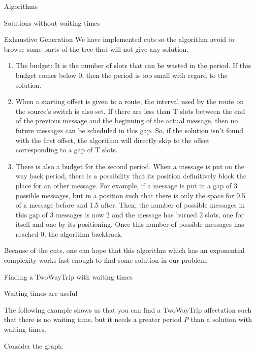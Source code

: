 \documentclass[a4paper,10pt]{report}
\begin{document}
\begin{chapter}{Algorithms}
\begin{section}{Solutions without waiting times}
\begin{subsection}{Exhaustive Generation}
We have implemented cuts so the algorithm avoid to browse some parts of the tree that will not give any solution.
\begin{enumerate}
 \item The budget: It is the number of slots that can be wasted in the period. If this budget comes below 0, then the period is too small with regard to
 the solution.
 \item When a starting offset is given to a route, the interval used by the route on the source's switch is also set. If there are less than T slots
 between the end of the previous message and the beginning of the actual message, then no future messages can be scheduled in this gap.
 So, if the solution isn't found with the first offset, the algorithm will directly skip to the offset corresponding to a gap of T slots.
 \item There is also a budget for the second period. When a message is put on the way back period, there is a possibility that its position definitively block the place for an other message. For example, if a message is put in a gap of 3 possible messages, but in a position such that there is only the space for 0.5 of a message before and 1.5 after. Then, the number of possible messages in this gap of 3 messages is now 2 and the message has burned 2 slots, one for itself and one by its positioning.
 Once this number of possible messages has reached 0, the algorithm backtrack.
\end{enumerate}

Because of the cuts, one can hope that this algorithm which has an exponential complexity works fast enough to find some solution in our problem.

\end{subsection}

 \end{section}

\begin{section}{Finding a TwoWayTrip with waiting times}
\begin{subsection}{Waiting times are useful}
 
The following example shows us that you can find a TwoWayTrip affectation such that there is no waiting time, but it needs a greater period $P$ than a
solution with waiting times.

Consider the graph: 
\begin{center}
 
\end{center}
\end{subsection}
\end{section}
\end{chapter}
\end{document}
